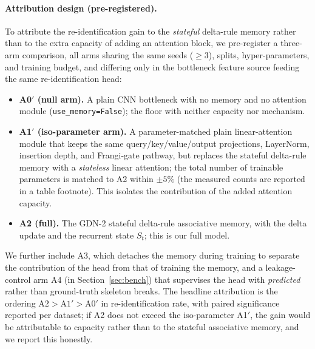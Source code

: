 \paragraph{Attribution design (pre-registered).}
To attribute the re-identification gain to the \emph{stateful} delta-rule memory
rather than to the extra capacity of adding an attention block, we pre-register a
three-arm comparison, all arms sharing the same seeds ($\geq 3$), splits,
hyper-parameters, and training budget, and differing only in the bottleneck feature
source feeding the same re-identification head:
\begin{itemize}
  \item \textbf{A0$'$ (null arm).} A plain CNN bottleneck with no memory and no
        attention module (\texttt{use\_memory=False}); the floor with neither
        capacity nor mechanism.
  \item \textbf{A1$'$ (iso-parameter arm).} A parameter-matched plain linear-attention
        module that keeps the same query/key/value/output projections,
        LayerNorm, insertion depth, and Frangi-gate pathway, but replaces the
        stateful delta-rule memory with a \emph{stateless} linear attention; the total
        number of trainable parameters is matched to A2 within $\pm 5\%$ (the measured
        counts are reported in a table footnote). This isolates the contribution of the
        added attention capacity.
  \item \textbf{A2 (full).} The GDN-2 stateful delta-rule associative memory, with the
        delta update and the recurrent state $S_t$; this is our full model.
\end{itemize}
We further include A3, which detaches the memory during training to separate the
contribution of the head from that of training the memory, and a leakage-control arm
A4 (in Section~\ref{sec:bench}) that supervises the head with \emph{predicted} rather
than ground-truth skeleton breaks. The headline attribution is the ordering
$\text{A2} > \text{A1}' > \text{A0}'$ in re-identification rate, with paired
significance reported per dataset; if A2 does not exceed the iso-parameter A1$'$, the
gain would be attributable to capacity rather than to the stateful associative memory,
and we report this honestly.

